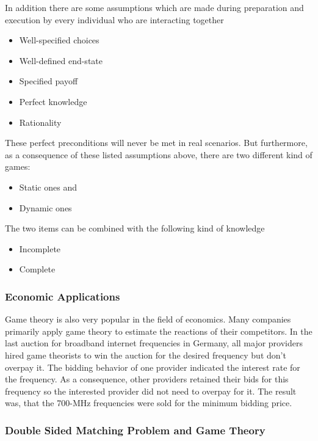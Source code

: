 In addition there are some assumptions which are made during preparation and execution by every individual who are interacting together \cite {gibbons1997gametheory}
\begin{itemize}
	\item Well-specified choices
	\item Well-defined end-state
	\item Specified payoff
	\item Perfect knowledge
	\item Rationality 
\end{itemize}

These perfect preconditions will never be met in real scenarios.
But furthermore, as a consequence of these listed assumptions above, there are two different kind of games:

\begin{itemize}
	\item Static ones and
	\item Dynamic ones
\end{itemize}

The two items can be combined with the following kind of knowledge

\begin{itemize}
	\item Incomplete
	\item Complete
\end{itemize}


\subsubsection{Economic Applications}
Game theory is also very popular in the field of economics.
Many companies primarily apply game theory to estimate the reactions of their competitors. 
In the last auction for broadband internet frequencies in Germany, all major providers hired game theorists to win the auction for the desired frequency but don't overpay it.
The bidding behavior of one provider indicated the interest rate for the frequency. 
As a consequence, other providers retained their bids for this frequency so the interested provider did not need to overpay for it. 
The result was, that the 700-MHz frequencies were sold for the minimum bidding price. \cite{gametheoryWelt}

\subsubsection{Double Sided Matching Problem and Game Theory}

